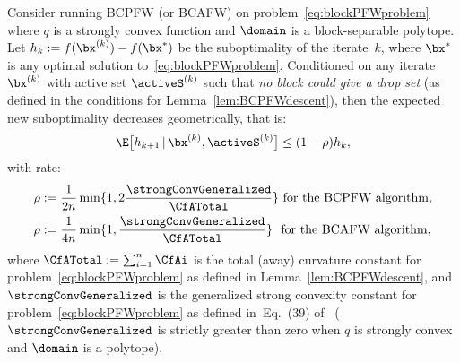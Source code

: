 \documentclass{article}
\begin{document}
\begin{theorem} \label{thm:BCPFW}
Consider running BCPFW (or BCAFW) on problem~\eqref{eq:blockPFWproblem} where $q$ is a strongly convex function and $\domain$ is a block-separable polytope. Let $h_k := f(\bx^{(k)}) - f(\bx^*)$ be the suboptimality of the iterate~$k$, where $\bx^*$ is any optimal solution to~\eqref{eq:blockPFWproblem}. Conditioned on any iterate $\bx^{(k)}$ with active set $\activeS^{(k)}$ such that \emph{no block could give a drop set} (as defined in the conditions for Lemma~\ref{lem:BCPFWdescent}), then the expected new suboptimality decreases geometrically, that is:
\begin{equation} \label{eq:BCPFWgeometric}
\E\big[ h_{k+1} \,|\, \bx^{(k)}, \activeS^{(k)} \big] \leq (1-\rho) h_k , 
\end{equation}
with rate:
\begin{align}
\rho &:= \frac{1}{2n} \min \{1, 2 \frac{\strongConvGeneralized}{\CfATotal} \} \,\, \text{for the BCPFW algorithm}, \label{eq:BCPFWrate} \\ 
\rho &:= \frac{1}{4n} \min \{1, \frac{\strongConvGeneralized}{\CfATotal} \} \,\,\,\, \text{for the BCAFW algorithm}, \label{eq:BCAFWrate} 
\end{align}
where $\CfATotal := \sum_{i=1}^n \CfAi$ is the total (away) curvature constant for problem~\eqref{eq:blockPFWproblem} as defined in Lemma~\ref{lem:BCPFWdescent}, and $\strongConvGeneralized$ is the generalized strong convexity constant for problem~\eqref{eq:blockPFWproblem} as defined in~Eq.~(39) of~\citet{LacosteJulien2015linearFW} ($\strongConvGeneralized$ is strictly greater than zero when $q$ is strongly convex and $\domain$ is a polytope).
\end{theorem}
\end{document}
